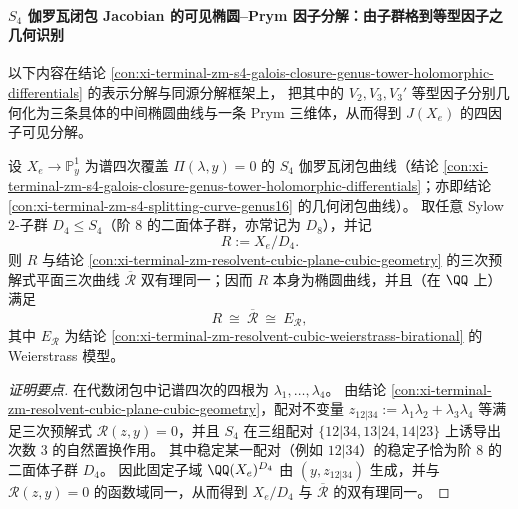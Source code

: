 \paragraph{\texorpdfstring{$S_4$}{S4} 伽罗瓦闭包 Jacobian 的可见椭圆--Prym 因子分解：由子群格到等型因子之几何识别}
以下内容在结论 \ref{con:xi-terminal-zm-s4-galois-closure-genus-tower-holomorphic-differentials} 的表示分解与同源分解框架上，
把其中的 \(V_2,V_3,V_3'\) 等型因子分别几何化为三条具体的中间椭圆曲线与一条 Prym 三维体，从而得到 \(J(X_e)\) 的四因子可见分解。

\begin{conclusion}\label{con:xi-terminal-zm-s4-d4fixedfield-resolvent-elliptic}
设 \(X_e\to\mathbb P^1_y\) 为谱四次覆盖 \(\Pi(\lambda,y)=0\) 的 \(S_4\) 伽罗瓦闭包曲线（结论 \ref{con:xi-terminal-zm-s4-galois-closure-genus-tower-holomorphic-differentials}；亦即结论 \ref{con:xi-terminal-zm-s4-splitting-curve-genus16} 的几何闭包曲线）。
取任意 Sylow \(2\)-子群 \(D_{4}\le S_{4}\)（阶 \(8\) 的二面体子群，亦常记为 \(D_{8}\)），并记
\[
R:=X_e/D_{4}.
\]
则 \(R\) 与结论 \ref{con:xi-terminal-zm-resolvent-cubic-plane-cubic-geometry} 的三次预解式平面三次曲线 \(\overline{\mathcal R}\) 双有理同一；因而 \(R\) 本身为椭圆曲线，并且（在 \(\QQ\) 上）满足
\[
R\ \cong\ \overline{\mathcal R}\ \cong\ E_{\mathscr R},
\]
其中 \(E_{\mathscr R}\) 为结论 \ref{con:xi-terminal-zm-resolvent-cubic-weierstrass-birational} 的 Weierstrass 模型。
\end{conclusion}
\begin{proof}[证明要点]
在代数闭包中记谱四次的四根为 \(\lambda_1,\dots,\lambda_4\)。
由结论 \ref{con:xi-terminal-zm-resolvent-cubic-plane-cubic-geometry}，配对不变量
\(
z_{12|34}:=\lambda_1\lambda_2+\lambda_3\lambda_4
\)
等满足三次预解式 \(\mathscr R(z,y)=0\)，并且 \(S_4\) 在三组配对 \(\{12|34,13|24,14|23\}\) 上诱导出次数 \(3\) 的自然置换作用。
其中稳定某一配对（例如 \(12|34\)）的稳定子恰为阶 \(8\) 的二面体子群 \(D_4\)。
因此固定子域 \(\QQ(X_e)^{D_4}\) 由 \((y,z_{12|34})\) 生成，并与 \(\mathscr R(z,y)=0\) 的函数域同一，从而得到 \(X_e/D_4\) 与 \(\overline{\mathcal R}\) 的双有理同一。
\end{proof}


